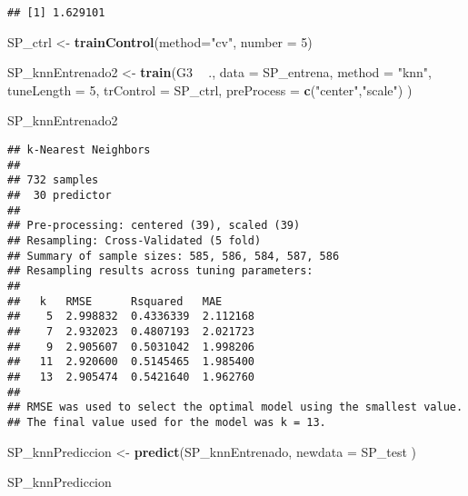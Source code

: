 \documentclass[
]{article}
\newenvironment{Shaded}{\begin{snugshade}}{\end{snugshade}}
\newcommand{\DataTypeTok}[1]{\textcolor[rgb]{0.13,0.29,0.53}{#1}}
\newcommand{\DecValTok}[1]{\textcolor[rgb]{0.00,0.00,0.81}{#1}}
\newcommand{\KeywordTok}[1]{\textcolor[rgb]{0.13,0.29,0.53}{\textbf{#1}}}
\newcommand{\NormalTok}[1]{#1}
\newcommand{\OperatorTok}[1]{\textcolor[rgb]{0.81,0.36,0.00}{\textbf{#1}}}
\newcommand{\StringTok}[1]{\textcolor[rgb]{0.31,0.60,0.02}{#1}}
\begin{document}
\begin{verbatim}
## [1] 1.629101
\end{verbatim}

\begin{Shaded}
\begin{Highlighting}[]
\NormalTok{SP_ctrl <-}\StringTok{ }\KeywordTok{trainControl}\NormalTok{(}\DataTypeTok{method=}\StringTok{"cv"}\NormalTok{, }\DataTypeTok{number =} \DecValTok{5}\NormalTok{) }
\end{Highlighting}
\end{Shaded}

\begin{Shaded}
\begin{Highlighting}[]
\NormalTok{SP_knnEntrenado2 <-}\StringTok{ }\KeywordTok{train}\NormalTok{(G3 }\OperatorTok{~}\StringTok{ }\NormalTok{., }
                \DataTypeTok{data =}\NormalTok{ SP_entrena, }
                \DataTypeTok{method =} \StringTok{"knn"}\NormalTok{,  }
                \DataTypeTok{tuneLength =} \DecValTok{5}\NormalTok{,}
                \DataTypeTok{trControl =}\NormalTok{ SP_ctrl,}
                \DataTypeTok{preProcess =} \KeywordTok{c}\NormalTok{(}\StringTok{"center"}\NormalTok{,}\StringTok{"scale"}\NormalTok{)}
\NormalTok{                )}

\NormalTok{SP_knnEntrenado2}
\end{Highlighting}
\end{Shaded}

\begin{verbatim}
## k-Nearest Neighbors 
## 
## 732 samples
##  30 predictor
## 
## Pre-processing: centered (39), scaled (39) 
## Resampling: Cross-Validated (5 fold) 
## Summary of sample sizes: 585, 586, 584, 587, 586 
## Resampling results across tuning parameters:
## 
##   k   RMSE      Rsquared   MAE     
##    5  2.998832  0.4336339  2.112168
##    7  2.932023  0.4807193  2.021723
##    9  2.905607  0.5031042  1.998206
##   11  2.920600  0.5145465  1.985400
##   13  2.905474  0.5421640  1.962760
## 
## RMSE was used to select the optimal model using the smallest value.
## The final value used for the model was k = 13.
\end{verbatim}

\begin{Shaded}
\begin{Highlighting}[]
\NormalTok{SP_knnPrediccion <-}\StringTok{ }\KeywordTok{predict}\NormalTok{(SP_knnEntrenado, }\DataTypeTok{newdata =}\NormalTok{ SP_test )}

\NormalTok{SP_knnPrediccion }
\end{Highlighting}
\end{Shaded}
\end{document}
